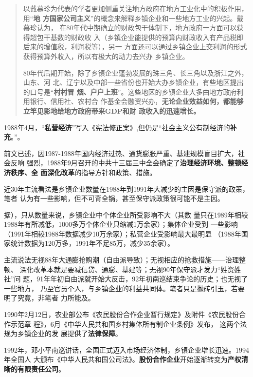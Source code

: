\begin{quotation}
  以戴慕珍为代表的学者更加侧重关注地方政府在地方工业化中的积极作用，用“\textbf{地
    方国家公司主义}”的概念来解释乡镇企业和一些地方工业的兴起。戴慕珍认为，
  在80年代中期确立的财政包干体制下，地方政府一方面可以获得超包干基数的财政收
  入（乡镇企业能提供的预算内财政收入有产品税即后来的增值税，利润税等），另一
  方面还可以通过乡镇企业上交利润的形式获得预算外收入，所以有极大的动力去兴办
  乡镇企业。

  80年代后期开始，除了乡镇企业蓬勃发展的珠三角、长三角以及浙江之外，山东、河
  北、辽宁以及中部一些省份也开始大办乡镇企业，有些地区提出的口号是“\textbf{村村冒
    烟、户户上班}”。这些地区的乡镇企业大多由地方政府利用银行、信用社、农村合
  作基金会融资兴办，\textbf{无论企业效益如何，都能够立竿见影地给地方政府带来GDP和财
    政收入的迅速增长。}
\end{quotation}

1988年4月，“\textbf{私营经济}”写入《宪法修正案》,但仍是“社会主义公有制经济的\textbf{补
充}。”。

前文已述，因1987-1988年国内经济过热、通货膨胀严重、基建规模盲目扩大，社会反响
强烈，1988年9月召开的中共十三届三中全会确定了\textbf{治理经济环境、整顿经济秩序、全
  面深化改革}的指导方针和政策、措施。


近30年主流看法是乡镇企业数量在1988年到1991年大减少的主因是保守派的政策，笔者
认为有一些影响，但不可背全锅，甚至保守派政策很可能不是主因。

据），只从数量来说，乡镇企业中个体企业所受影响不大（其数
量只在1989年相较1988年有所减低，1000多万个体企业只缩减1万余家）；集体企业受到
一些影响（1991年相较1988年数据减少10万余家）；私营企业受影响最大最明显
（1988年国家统计数据为120万多，1991年不足85万，减少35余家）。

主流说法无视88年大通膨抢购潮（自由派导致）；无视相应的抢救措施——治理整顿、
深化改革本就是要减信贷、通膨、基建等；无视90年保守派才发力“姓资姓社”问
题，91年年初自由派就开始大反击，92年初南巡结束争论的历史；也无视了一些地方，
乃至官员个人，与乡镇企业的利益共同体。笔者只是抛砖引玉，若要明了究竟，非笔者
力所能及。



1990年2月12日，农业部公布《农民股份合作企业暂行规定》及附件《农民股份合作示范章
程》，6月《中华人民共和国乡村集体所有制企业条例》发布， 这两个法规为乡镇企业的发
展提供了\textbf{法律保障}。


1992年，邓小平南巡讲话，全国正式迈入市场经济体制，乡镇企业增长迅速。1994年全国人
大颁布《中华人民共和国公司法》。\textbf{股份合作企业}开始逐渐转变为\textbf{产权清
  晰的有限责任公司}。


